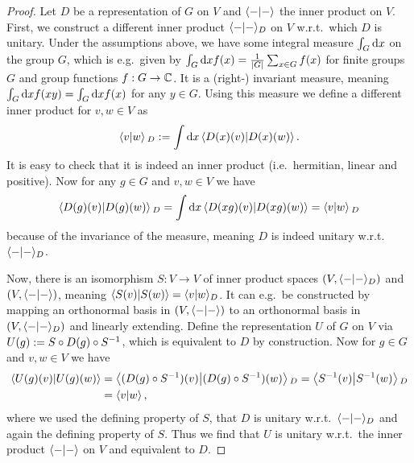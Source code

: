 \begin{proof}
    Let $D$ be a representation of $G$ on $V$ and $\braket{\blank}{\blank}$ the inner product on $V$.
    First, we construct a different inner product $\braket{\blank}{\blank}_D$ on $V$ w.r.t.~which $D$ is unitary.
    Under the assumptions above, we have some integral measure $\int_G \,\! \mathrm{d} {x} \,\!$ on the group $G$, which is e.g.~given by $\int_G \d{x} f(x) =\tfrac{1}{\abs{G}} \sum_{x\in G} f(x)$ for finite groups $G$ and group functions $f: G \to \mathbb{C}$.
    It is a (right-) invariant measure, meaning $\int_G \,\! \mathrm{d} {x} \,\! f(xy) = \int_G \,\! \mathrm{d} {x} \,\! f(x)$ for any $y \in G$.
    Using this measure we define a different inner product for $v, w \in V$ as
    \begin{equation}
        \braket{v}{w}_D := \int \d{x} \braket{D(x)(v)}{D(x)(w)}
        .
    \end{equation}
    It is easy to check that it is indeed an inner product (i.e.~hermitian, linear and positive).
    Now for any $g \in G$ and $v, w \in V$ we have
    \begin{equation}
        \braket{D(g)(v)}{D(g)(w)}_D = \int \d{x} \braket{D(xg)(v)}{D(xg)(w)} = \braket{v}{w}_D
    \end{equation}
    because of the invariance of the measure, meaning $D$ is indeed unitary w.r.t.~$\braket{\blank}{\blank}_D$.
    
    Now, there is an isomorphism $S: V \to V$ of inner product spaces $(V, \braket{\blank}{\blank}_D)$ and $(V, \braket{\blank}{\blank})$, meaning $\braket{S(v)}{S(w)} = \braket{v}{w}_D$.
    It can e.g.~be constructed by mapping an orthonormal basis in $(V, \braket{\blank}{\blank})$ to an orthonormal basis in $(V, \braket{\blank}{\blank}_D)$ and linearly extending.
    Define the representation $U$ of $G$ on $V$ via $U(g) := S \circ D(g) \circ S^{-1}$, which is equivalent to $D$ by construction.
    Now for $g\in G$ and $v, w \in V$ we have
    \begin{align}
    \begin{split}
        \braket{U(g)(v)}{U(g)(w)}
        &= \braket{(D(g) \compose S^{-1})(v)}{(D(g) \compose S^{-1})(w)}_D
        = \braket{S^{-1}(v)}{S^{-1}(w)}_D
        \\
        &= \braket{v}{w},
    \end{split}
    \end{align}
    where we used the defining property of $S$, that $D$ is unitary w.r.t.~$\braket{\blank}{\blank}_D$ and again the defining property of $S$.
    Thus we find that $U$ is unitary w.r.t.~the inner product $\braket{\blank}{\blank}$ on $V$ and equivalent to $D$.
\end{proof}

